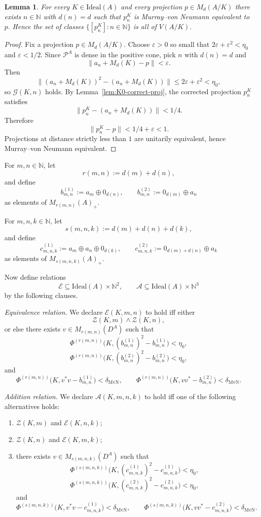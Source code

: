 \documentclass[12pt,fleqn,a4paper]{amsart}
\renewcommand{\le}{\leqslant}
\numberwithin{equation}{section}
\newtheorem{lemma}[theorem]{Lemma}
\theoremstyle{definition}
\newcommand{\N}{\mathbb{N}}
\newcommand{\Ideal}{\mathrm{Ideal}}
\begin{document}
\begin{lemma}
\label{lem:K0-dense-proj}
For every $K\in\Ideal(A)$ and every projection
$p\in M_d(A/K)$ there exists $n\in\N$ with $d(n)=d$ such that
$p_n^K$ is Murray--von Neumann equivalent to $p$.
Hence the set of classes $\{[p_n^K]:n\in\N\}$ is all of
$V(A/K)$.
\end{lemma}

\begin{proof}
Fix a projection $p\in M_d(A/K)$.
Choose $\varepsilon>0$ so small that $2\varepsilon+\varepsilon^2<\eta_0$ and
$\varepsilon<1/2$.
Since $\mathcal P^A$ is dense in the positive cone, pick $n$ with $d(n)=d$ and
\[
\|a_n+M_d(K)-p\|<\varepsilon.
\]
Then
\[
\|(a_n+M_d(K))^2-(a_n+M_d(K))\|
\le 2\varepsilon+\varepsilon^2<\eta_0,
\]
so $\mathcal G(K,n)$ holds.
By Lemma~\ref{lem:K0-correct-proj}, the corrected projection $p_n^K$ satisfies
\[
\|p_n^K-(a_n+M_d(K))\|<1/4.
\]
Therefore
\[
\|p_n^K-p\|<1/4+\varepsilon<1.
\]
Projections at distance strictly less than $1$ are unitarily equivalent, hence
Murray--von Neumann equivalent.
\end{proof}

For $m,n\in\N$, let
\[
r(m,n):=d(m)+d(n),
\]
and define
\[
b_{m,n}^{(1)}:=a_m\oplus 0_{d(n)},
\qquad
b_{m,n}^{(2)}:=0_{d(m)}\oplus a_n
\]
as elements of $M_{r(m,n)}(A)_+$.

For $m,n,k\in\N$, let
\[
s(m,n,k):=d(m)+d(n)+d(k),
\]
and define
\[
c_{m,n,k}^{(1)}:=a_m\oplus a_n\oplus 0_{d(k)},
\qquad
c_{m,n,k}^{(2)}:=0_{d(m)+d(n)}\oplus a_k
\]
as elements of $M_{s(m,n,k)}(A)_+$.

Now define relations
\[
\mathcal E\subseteq \Ideal(A)\times\N^2,
\qquad
\mathcal A\subseteq \Ideal(A)\times\N^3
\]
by the following clauses.

\smallskip
\noindent\emph{Equivalence relation.}
We declare $\mathcal E(K,m,n)$ to hold iff either
\[
\mathcal Z(K,m)\wedge \mathcal Z(K,n),
\]
or else there exists
$v\in M_{r(m,n)}(D^A)$ such that
\[
\Phi^{(r(m,n))}\bigl(K,(b_{m,n}^{(1)})^2-b_{m,n}^{(1)}\bigr)<\eta_0,
\]
\[
\Phi^{(r(m,n))}\bigl(K,(b_{m,n}^{(2)})^2-b_{m,n}^{(2)}\bigr)<\eta_0,
\]
and
\[
\Phi^{(r(m,n))}\bigl(K,v^*v-b_{m,n}^{(1)}\bigr)<\delta_{\mathrm{MvN}},
\qquad
\Phi^{(r(m,n))}\bigl(K,vv^*-b_{m,n}^{(2)}\bigr)<\delta_{\mathrm{MvN}}.
\]

\smallskip
\noindent\emph{Addition relation.}
We declare $\mathcal A(K,m,n,k)$ to hold iff one of the following alternatives holds:
\begin{enumerate}[label=\textup{(A\arabic*)}]
\item $\mathcal Z(K,m)$ and $\mathcal E(K,n,k)$;
\item $\mathcal Z(K,n)$ and $\mathcal E(K,m,k)$;
\item there exists $v\in M_{s(m,n,k)}(D^A)$ such that
\[
\Phi^{(s(m,n,k))}\bigl(K,(c_{m,n,k}^{(1)})^2-c_{m,n,k}^{(1)}\bigr)<\eta_0,
\]
\[
\Phi^{(s(m,n,k))}\bigl(K,(c_{m,n,k}^{(2)})^2-c_{m,n,k}^{(2)}\bigr)<\eta_0,
\]
and
\[
\Phi^{(s(m,n,k))}\bigl(K,v^*v-c_{m,n,k}^{(1)}\bigr)<\delta_{\mathrm{MvN}},
\qquad
\Phi^{(s(m,n,k))}\bigl(K,vv^*-c_{m,n,k}^{(2)}\bigr)<\delta_{\mathrm{MvN}}.
\]
\end{enumerate}
\end{document}
